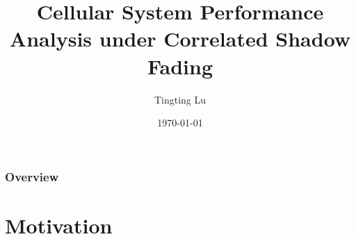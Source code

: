 \documentclass{beamer}
\title[Thesis Defense]{Cellular System Performance Analysis under Correlated Shadow Fading} %
\author{Tingting Lu} %
\institute[NYU] %
{
New York University \\ %
Tandon School of Engineering\\
\medskip
\textit{tl984@nyu.edu} %
}
\date{\today} %
\begin{document}
\begin{frame}
\titlepage %
\end{frame}

\begin{frame}
\frametitle{Overview} %
\tableofcontents %
\end{frame}


\section{Motivation} %
\end{document}
